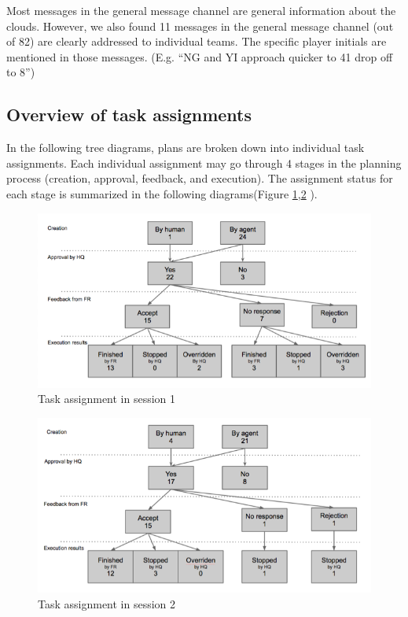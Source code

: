 Most messages in the general message channel are general information about the clouds. However, we also found 11 messages in the general message channel (out of 82) are clearly addressed to individual teams. The specific player initials are mentioned in those messages. (E.g. ``NG and YI approach quicker to 41 drop off to 8'')\\

\subsection{Overview of task assignments}
In the following tree diagrams, plans are broken down into individual task assignments. Each individual assignment may go through 4 stages in the planning process (creation, approval, feedback, and execution). The assignment status for each stage is summarized in the following diagrams(Figure \ref{fig:TaskAsSession1},\ref{fig:TaskAsSession2} ). \\

\begin{figure}[ht]
 \includegraphics[width=1\textwidth]{img/study3/TaskAsSession1}
\caption{Task assignment in session 1}
\label{fig:TaskAsSession1}
\end{figure}

\begin{figure}[ht]
 \includegraphics[width=1\textwidth]{img/study3/TaskAsSession2}
\caption{Task assignment in session 2}
\label{fig:TaskAsSession2}
\end{figure}

